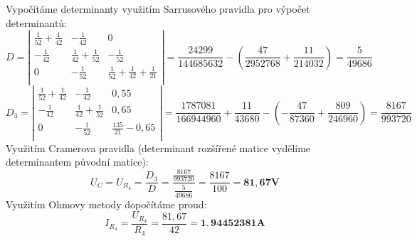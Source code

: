 \newpage
Vypočítáme determinanty využitím Sarrusového pravidla pro výpočet determinantů:
\[
D = 
\left|
\begin{array}{ccc}
\frac{1}{52}+\frac{1}{42} & -\frac{1}{42} & 0\\
-\frac{1}{42} & \frac{1}{42}+\frac{1}{52} & -\frac{1}{52}\\
0 & -\frac{1}{52} & \frac{1}{52}+\frac{1}{42}+\frac{1}{21}\\
\end{array}
\right|
 = \frac{24299}{144685632}-(\frac{47}{2952768}+\frac{11}{214032})
 = \frac{5}{49686}
\]
\newline
\[
D_3 = 
\left|
\begin{array}{ccc}
\frac{1}{52}+\frac{1}{42} & -\frac{1}{42} & 0,55\\
-\frac{1}{42} & \frac{1}{42}+\frac{1}{52} & 0,65\\
0 & -\frac{1}{52} & \frac{135}{21}-0,65\\
\end{array}
\right|
 = \frac{1787081}{166944960}+\frac{11}{43680}-(-\frac{47}{87360}+\frac{809}{246960})
 = \frac{8167}{993720}
\]
\newline
Využitím Cramerova pravidla (determinant rozšířené matice vydělíme determinantem původní matice):
$$U_C = U_{R_4} = \frac{D_3}{D} = \frac{\frac{8167}{993720}}{\frac{5}{49686}} = \frac{8167}{100} = \mathbf{81,67V}$$
\newline
Využitím Ohmovy metody dopočítáme proud:
$$I_{R_4} = \frac{U_{R_4}}{R_4} = \frac{81,67}{42} = \mathbf{1,94452381A}$$